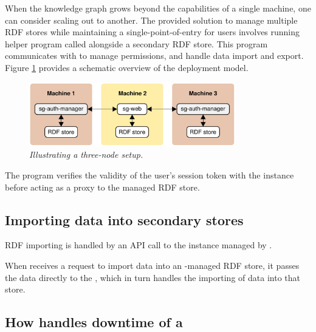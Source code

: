   When the knowledge graph grows beyond the capabilities of a single machine,
  one can consider scaling out to another.  The provided solution to manage
  multiple RDF stores while maintaining a single-point-of-entry for users
  involves running helper program called  alongside
  a secondary RDF store.  This program communicates with  to
  manage permissions, and handle data import and export.  Figure
  \ref{fig:sg-auth-manager} provides a schematic overview of the deployment
  model.

  \begin{figure}[H]
    \begin{center}
    \includegraphics[width=0.8\textwidth]{figures/sg-auth-manager-scaleout.pdf}
    \end{center}
    \caption{\textit{Illustrating a three-node setup.}}
    \label{fig:sg-auth-manager}
  \end{figure}


  The  program verifies the validity of the user's session
  token with the  instance before acting as a proxy to the managed
  RDF store.

\subsection{Importing data into secondary stores}

  RDF importing is handled by an API call to the instance managed by
  .

  When  receives a request to import data into an
  -managed RDF store, it passes the data directly
  to the , which in turn handles the importing of data
  into that store.

\subsection{How  handles downtime of a }

